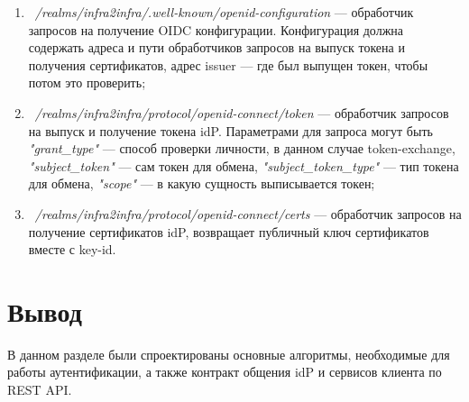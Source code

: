 \begin{enumerate}
\item ~\textit{/realms/infra2infra/.well-known/openid-configuration} --- обработчик запросов на получение OIDC конфигурации. Конфигурация должна содержать адреса и пути обработчиков запросов на выпуск токена и получения сертификатов, адрес issuer --- где был выпущен токен, чтобы потом это проверить;
\item ~\textit{/realms/infra2infra/protocol/openid-connect/token} --- обработчик запросов на выпуск и получение токена idP. Параметрами для запроса могут быть \textit{"grant\_type"} --- способ проверки личности, в данном случае token-exchange, \textit{"subject\_token"} --- сам токен для обмена, \textit{"subject\_token\_type"} --- тип токена для обмена, \textit{"scope"} --- в какую сущность выписывается токен;
\item ~\textit{/realms/infra2infra/protocol/openid-connect/certs} --- обработчик запросов на получение сертификатов idP, возвращает публичный ключ сертификатов вместе с key-id.
\end{enumerate}

\section*{Вывод}
В данном разделе были спроектированы основные алгоритмы, необходимые для работы аутентификации, а также контракт общения idP и сервисов клиента по REST API.